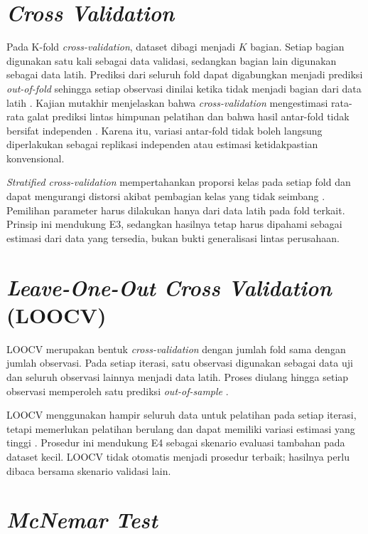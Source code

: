 \section{\textit{Cross Validation}}

Pada K-fold \textit{cross-validation}, dataset dibagi menjadi $K$ bagian. Setiap bagian digunakan satu kali sebagai data validasi, sedangkan bagian lain digunakan sebagai data latih. Prediksi dari seluruh fold dapat digabungkan menjadi prediksi \textit{out-of-fold} sehingga setiap observasi dinilai ketika tidak menjadi bagian dari data latih \cite{ArlotCelisse2010}. Kajian mutakhir menjelaskan bahwa \textit{cross-validation} mengestimasi rata-rata galat prediksi lintas himpunan pelatihan dan bahwa hasil antar-fold tidak bersifat independen \cite{BatesEtAl2024CV}. Karena itu, variasi antar-fold tidak boleh langsung diperlakukan sebagai replikasi independen atau estimasi ketidakpastian konvensional.

\textit{Stratified cross-validation} mempertahankan proporsi kelas pada setiap fold dan dapat mengurangi distorsi akibat pembagian kelas yang tidak seimbang \cite{Kohavi1995}. Pemilihan parameter harus dilakukan hanya dari data latih pada fold terkait. Prinsip ini mendukung E3, sedangkan hasilnya tetap harus dipahami sebagai estimasi dari data yang tersedia, bukan bukti generalisasi lintas perusahaan.

\section{\textit{Leave-One-Out Cross Validation} (LOOCV)}

LOOCV merupakan bentuk \textit{cross-validation} dengan jumlah fold sama dengan jumlah observasi. Pada setiap iterasi, satu observasi digunakan sebagai data uji dan seluruh observasi lainnya menjadi data latih. Proses diulang hingga setiap observasi memperoleh satu prediksi \textit{out-of-sample} \cite{ArlotCelisse2010}.

LOOCV menggunakan hampir seluruh data untuk pelatihan pada setiap iterasi, tetapi memerlukan pelatihan berulang dan dapat memiliki variasi estimasi yang tinggi \cite{Kohavi1995}. Prosedur ini mendukung E4 sebagai skenario evaluasi tambahan pada dataset kecil. LOOCV tidak otomatis menjadi prosedur terbaik; hasilnya perlu dibaca bersama skenario validasi lain.

\section{\textit{McNemar Test}}

